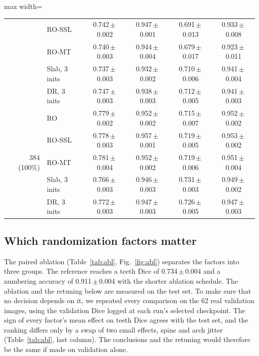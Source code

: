 \documentclass[preprint,12pt]{elsarticle}
\newcommand{\pmsd}[2]{#1\,$\pm$\,#2}
\begin{document}
\begin{table}[t]
\begin{adjustbox}{max width=\linewidth}
\begin{tabular}{@{}rlcccc@{}}
 & RO-SSL & \pmsd{0.742}{0.002} & \pmsd{0.947}{0.001} & \pmsd{0.691}{0.013} & \pmsd{0.933}{0.008} \\
 & RO-MT & \pmsd{0.740}{0.003} & \pmsd{0.944}{0.004} & \pmsd{0.679}{0.017} & \pmsd{0.923}{0.011} \\
 & Slab, 3 inits & \pmsd{0.737}{0.003} & \pmsd{0.932}{0.002} & \pmsd{0.710}{0.006} & \pmsd{0.941}{0.004} \\
 & DR, 3 inits & \pmsd{0.747}{0.003} & \pmsd{0.938}{0.003} & \pmsd{0.712}{0.005} & \pmsd{0.941}{0.003} \\
\midrule
\multirow{5}{*}{384 (100\%)} & RO & \pmsd{0.779}{0.002} & \pmsd{0.952}{0.002} & \pmsd{0.715}{0.007} & \pmsd{0.952}{0.002} \\
 & RO-SSL & \pmsd{0.778}{0.003} & \pmsd{0.957}{0.001} & \pmsd{0.719}{0.005} & \pmsd{0.953}{0.002} \\
 & RO-MT & \pmsd{0.781}{0.004} & \pmsd{0.952}{0.002} & \pmsd{0.719}{0.006} & \pmsd{0.951}{0.004} \\
 & Slab, 3 inits & \pmsd{0.766}{0.003} & \pmsd{0.946}{0.003} & \pmsd{0.731}{0.003} & \pmsd{0.949}{0.002} \\
 & DR, 3 inits & \pmsd{0.772}{0.003} & \pmsd{0.947}{0.003} & \pmsd{0.726}{0.005} & \pmsd{0.947}{0.003} \\

\bottomrule
\end{tabular}
\end{adjustbox}
\end{table}

\subsection{Which randomization factors matter}
The paired ablation (Table~\ref{tab:abl}, Fig.~\ref{fig:abl}) separates the factors into three groups. The reference
reaches a teeth Dice of \pmsd{0.734}{0.004} and a numbering accuracy of \pmsd{0.911}{0.004} with the shorter ablation
schedule. The ablation and the retuning below are measured on the test set. To make sure that no decision depends on
it, we repeated every comparison on the 62 real validation images, using the validation Dice logged at each run's
selected checkpoint. The sign of every factor's mean effect on teeth Dice agrees with the test set, and the ranking differs only by a swap
of two small effects, spine and arch jitter (Table~\ref{tab:abl}, last column). The conclusions and the retuning would
therefore be the same if made on validation alone.
\end{document}

